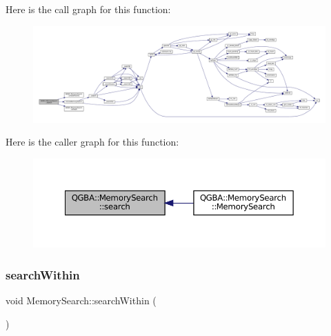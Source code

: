 Here is the call graph for this function\+:
\nopagebreak
\begin{figure}[H]
\begin{center}
\leavevmode
\includegraphics[width=350pt]{class_q_g_b_a_1_1_memory_search_acf927801198317c863b8918ab85eb94f_cgraph}
\end{center}
\end{figure}
Here is the caller graph for this function\+:
\nopagebreak
\begin{figure}[H]
\begin{center}
\leavevmode
\includegraphics[width=350pt]{class_q_g_b_a_1_1_memory_search_acf927801198317c863b8918ab85eb94f_icgraph}
\end{center}
\end{figure}
\mbox{\label{class_q_g_b_a_1_1_memory_search_a0a52eb65f64f02317f934b410135a614}} 
\subsubsection{\texorpdfstring{search\+Within}{searchWithin}}
{\footnotesize\ttfamily void Memory\+Search\+::search\+Within (\begin{DoxyParamCaption}{ }\end{DoxyParamCaption})\hspace{0.3cm}{\ttfamily [slot]}}

